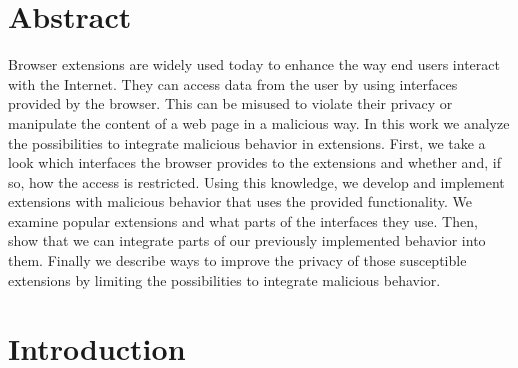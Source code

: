 \documentclass[article,colorback,accentcolor=tud9c,type=bsc]{tudthesis}
\let\stdsection\section
\renewcommand\section{\newpage\stdsection}
\begin{document}
	
	\author{Arno Manfred Krause}
	
	\newpage
	
\section{Abstract}
	
	Browser extensions are widely used today to enhance the way end users interact with the Internet. They can access data from the user by using interfaces provided by the browser. This can be misused to violate their privacy or manipulate the content of a web page in a malicious way. In this work we analyze the possibilities to integrate malicious behavior in extensions. First, we take a look which interfaces the browser provides to the extensions and whether and, if so, how the access is restricted. Using this knowledge, we develop and implement extensions with malicious behavior that uses the provided functionality. We examine popular extensions and what parts of the interfaces they use. Then, show that we can integrate parts of our previously implemented behavior into them. Finally we describe ways to improve the privacy of those susceptible extensions by limiting the possibilities to integrate malicious behavior.	
	
\section{Introduction}
	
\end{document}
